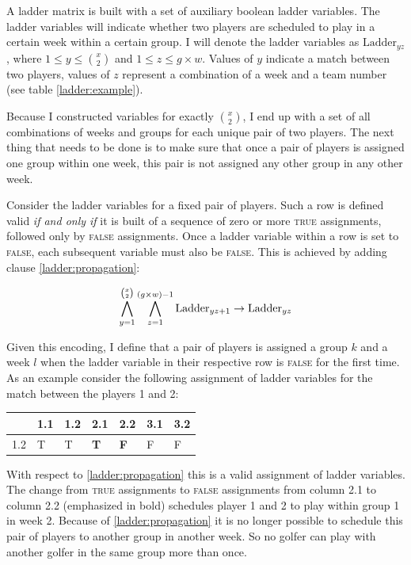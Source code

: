 \documentclass[a4paper]{scrartcl}
\begin{document}
A ladder matrix is built with a set of auxiliary boolean ladder variables. The ladder variables will indicate whether two players are scheduled to play in a certain week within a certain group. I will denote the ladder variables as $\text{Ladder}_{yz}$, where $1 \leq y \leq {x \choose 2}$ and $1 \leq z \leq g \times w$. Values of $y$ indicate a match between two players, values of $z$ represent a combination of a week and a team number (see table \ref{ladder:example}). 



Because I constructed variables for exactly ${x \choose 2}$, I end up with a set of all combinations of weeks and groups for each unique pair of two players. The next thing that needs to be done is to make sure that once a pair of players is assigned one group within one week, this pair is not assigned any other group in any other week.

Consider the ladder variables for a fixed pair of players. Such a row is defined valid \emph{if and only if} it is built of a sequence of zero or more \textsc{true} assignments, followed only by \textsc{false} assignments. Once a ladder variable within a row is set to \textsc{false}, each subsequent variable must also be \textsc{false}. This is achieved by adding clause \ref{ladder:propagation}:

\begin{equation}
\label{ladder:propagation}
\centering
    \bigwedge \limits_{y=1}^{{x \choose 2}}
    \bigwedge \limits_{z=1}^{(g \times w)-1}
    \text{Ladder}_{yz+1}
    \to
    \text{Ladder}_{yz}
\end{equation}

Given this encoding, I define that a pair of players is assigned a group $k$ and a week $l$ when the ladder variable in their respective row is \textsc{false} for the first time. As an example consider the following assignment of ladder variables for the match between the players 1 and 2:

\begin{table}[h]
\centering
\begin{tabular}{ l | l | l | l | l | l | l }
    & 1.1 & 1.2 & 2.1 & 2.2 & 3.1 & 3.2 \\
\hline
1.2 & T & T & \textbf{T} & \textbf{F} & F & F \\
\end{tabular}
\end{table}

With respect to \ref{ladder:propagation} this is a valid assignment of ladder variables. The change from \textsc{true} assignments to \textsc{false} assignments from column 2.1 to column 2.2 (emphasized in bold) schedules player 1 and 2 to play within group 1 in week 2. Because of \ref{ladder:propagation} it is no longer possible to schedule this pair of players to another group in another week. So no golfer can play with another golfer in the same group more than once.
\end{document}
